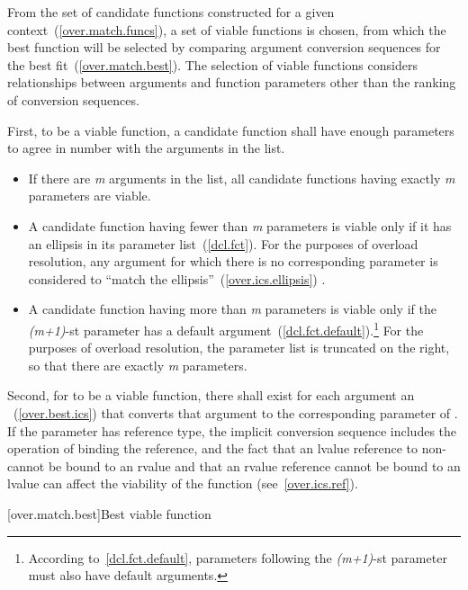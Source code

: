 \pnum
From the set of candidate functions constructed for a given
context~(\ref{over.match.funcs}), a set of viable functions is
chosen, from which the best function will be selected by
comparing argument conversion sequences for the best fit~(\ref{over.match.best}).
The selection of viable functions considers
relationships between arguments and function parameters other
than the ranking of conversion sequences.

\pnum
{}%
%
First, to be a viable function, a candidate function shall have
enough parameters to agree in number with the arguments in the
list.

\begin{itemize}
\item
If there are
\textit{m}
arguments in the list, all candidate
functions having exactly
\textit{m}
parameters are viable.
\item
A candidate function having fewer than
\textit{m}
parameters is
viable only if it has an ellipsis in its parameter list~(\ref{dcl.fct}).
For the purposes of overload resolution,
any argument for which there is no corresponding parameter is
considered to ``match the ellipsis''~(\ref{over.ics.ellipsis}) .
\item
A candidate function having more than
\textit{m}
parameters is viable
only if the
\textit{(m+1)}-st
parameter has a default
argument~(\ref{dcl.fct.default}).\footnote{According to~\ref{dcl.fct.default},
parameters following the
\textit{(m+1)}-st
parameter must also have default arguments.}
For the purposes of overload
resolution, the parameter list is truncated on the right, so
that there are exactly
\textit{m}
parameters.
\end{itemize}

\pnum
Second, for
to be a viable function, there shall exist for each
argument an
~(\ref{over.best.ics}) that
converts that argument to the corresponding parameter of
.
If the parameter has reference type, the implicit conversion sequence
includes the operation of binding the reference, and the fact that
an lvalue reference to non- cannot be bound to an rvalue
and that an rvalue reference cannot be bound to an lvalue
can affect
the viability of the function (see~\ref{over.ics.ref}).

[over.match.best]{Best viable function}%

